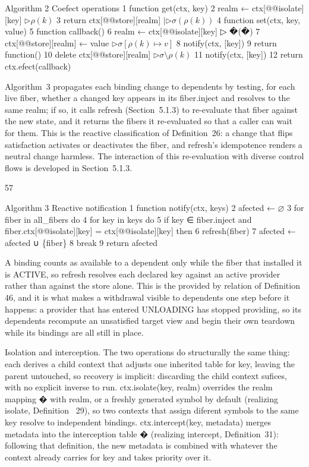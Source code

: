 \documentclass[
  10
]{article}
\begin{document}
Algorithm 2 Coefect operations 1 function get(ctx, key) 2 realm ←
ctx{[}@@isolate{]}{[}key{]} \(\triangleright \rho ( k )\) 3 return
ctx{[}@@store{]}{[}realm{]} \(| \triangleright \sigma ( \rho ( k ) )\) 4
function set(ctx, key, value) 5 function callback() 6 realm ←
ctx{[}@@isolate{]}{[}key{]} ▷ �(�) 7 ctx{[}@@store{]}{[}realm{]} ← value
\(\triangleright \sigma [ \rho ( k ) \mapsto v ]\) 8 notify(ctx,
{[}key{]}) 9 return function() 10 delete ctx{[}@@store{]}{[}realm{]}
\(\triangleright \sigma \setminus \rho ( k )\) 11 notify(ctx, {[}key{]})
12 return ctx.efect(callback)

Algorithm~3 propagates each binding change to dependents by testing, for
each live fiber, whether a changed key appears in its fiber.inject and
resolves to the same realm; if so, it calls refresh (Section~5.1.3) to
re-evaluate that fiber against the new state, and it returns the fibers
it re-evaluated so that a caller can wait for them. This is the reactive
classification of Definition~26: a change that flips satisfaction
activates or deactivates the fiber, and refresh's idempotence renders a
neutral change harmless. The interaction of this re-evaluation with
diverse control flows is developed in Section~5.1.3.

57

Algorithm 3 Reactive notification 1 function notify(ctx, keys) 2 afected
← ⌀ 3 for fiber in all\_fibers do 4 for key in keys do 5 if key ∈
fiber.inject and fiber.ctx{[}@@isolate{]}{[}key{]} =
ctx{[}@@isolate{]}{[}key{]} then 6 refresh(fiber) 7 afected ← afected ∪
\{fiber\} 8 break 9 return afected

A binding counts as available to a dependent only while the fiber that
installed it is ACTIVE, so refresh resolves each declared key against an
active provider rather than against the store alone. This is the
provided by relation of Definition~ 46, and it is what makes a
withdrawal visible to dependents one step before it happens: a provider
that has entered UNLOADING has stopped providing, so its dependents
recompute an unsatisfied target view and begin their own teardown while
its bindings are all still in place.

Isolation and interception. The two operations do structurally the same
thing: each derives a child context that adjusts one inherited table for
key, leaving the parent untouched, so recovery is implicit: discarding
the child context sufices, with no explicit inverse to run.
ctx.isolate(key, realm) overrides the realm mapping � with realm, or a
freshly generated symbol by default (realizing isolate, Definition~ 29),
so two contexts that assign diferent symbols to the same key resolve to
independent bindings. ctx.intercept(key, metadata) merges metadata into
the interception table � (realizing intercept, Definition~31): following
that definition, the new metadata is combined with whatever the context
already carries for key and takes priority over it.
\end{document}
